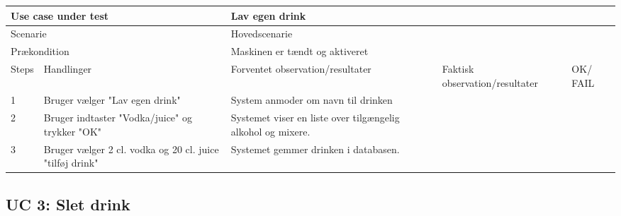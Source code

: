 \begin{table}[H]
\begin{tabular}{|p{1cm}|p{4cm}|p{4cm}|p{4cm}|p{1cm}|}
\hline
\multicolumn{2}{|p{5cm}|}{Use case under test} & \multicolumn{3}{p{9cm}|}{Lav egen drink}                                       \\ \hline
\multicolumn{2}{|p{5cm}|}{Scenarie}            & \multicolumn{3}{p{9cm}|}{Hovedscenarie}                                          \\ \hline
\multicolumn{2}{|p{5cm}|}{Prækondition}        & \multicolumn{3}{p{9cm}|}{Maskinen er tændt og aktiveret}                                 \\ \hline
Steps               & Handlinger          & Forventet observation/resultater & Faktisk observation/resultater & OK/ FAIL \\ \hline
1    & Bruger vælger "Lav egen drink"  & System anmoder om navn til drinken &   &         \\ \hline
2    & Bruger indtaster "Vodka/juice" og trykker "OK"  & Systemet viser en liste over tilgængelig alkohol og mixere.  &   &         \\ \hline
3    & Bruger vælger 2 cl. vodka og 20 cl. juice "tilføj drink"  & Systemet gemmer drinken i databasen.  &   &         \\ \hline

\end{tabular}
\end{table}

\subsection{UC 3: Slet drink}

